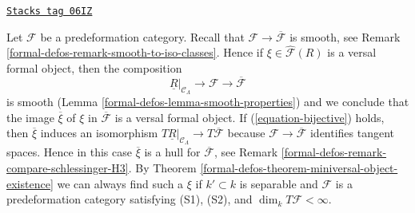 \begin{remark}
\label{formal-defos-remark-compose-minimal-into-iso-classes}
\href{https://stacks.math.columbia.edu/tag/06IZ}{\texttt{Stacks tag 06IZ}}

Let $\mathcal{F}$ be a predeformation category. Recall that
$\mathcal{F} \to \overline{\mathcal{F}}$ is smooth, see
Remark \ref{formal-defos-remark-smooth-to-iso-classes}. Hence if
$\xi \in \widehat{\mathcal{F}}(R)$ is a versal formal object,
then the composition
$$
\underline{R}|_{\mathcal{C}_\Lambda} \longrightarrow
\mathcal{F} \longrightarrow \overline{\mathcal{F}}
$$
is smooth (Lemma \ref{formal-defos-lemma-smooth-properties}) and we conclude
that the image $\overline{\xi}$ of $\xi$ in
$\overline{\mathcal{F}}$ is a versal formal object.
If (\ref{equation-bijective}) holds, then $\overline{\xi}$
induces an isomorphism
$T\underline{R}|_{\mathcal{C}_\Lambda} \to T\overline{\mathcal{F}}$
because $\mathcal{F} \to \overline{\mathcal{F}}$ identifies tangent spaces.
Hence in this case $\overline{\xi}$
is a hull for $\overline{\mathcal{F}}$, see
Remark \ref{formal-defos-remark-compare-schlessinger-H3}.
By Theorem \ref{formal-defos-theorem-miniversal-object-existence}
we can always find such a $\xi$ if $k' \subset k$ is separable and
$\mathcal{F}$ is a predeformation category satisfying
(S1), (S2), and $\dim_k T\mathcal{F} < \infty$.
\end{remark}

